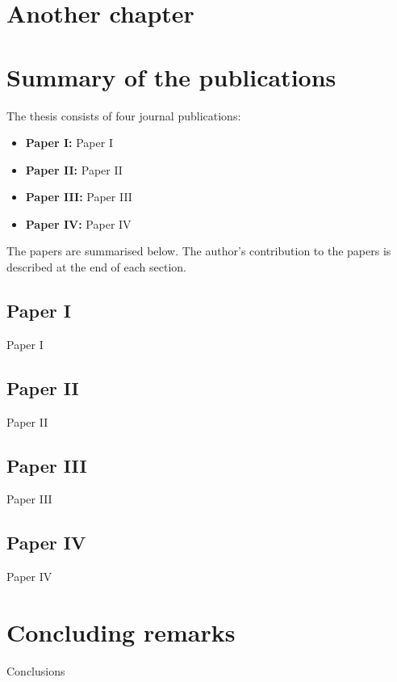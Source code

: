 \documentclass[11pt,english]{report}
\begin{document}
\chapter{Another chapter}



\chapter{Summary of the publications}

The thesis consists of four journal publications:
\begin{itemize}
  \item \textbf{Paper I:} Paper I
  \item \textbf{Paper II:} Paper II
  \item \textbf{Paper III:} Paper III
  \item \textbf{Paper IV:} Paper IV
\end{itemize}
The papers are summarised below. The author's contribution to the papers is
described at the end of each section.

\section{Paper I}
Paper I

\section{Paper II}
Paper II

\section{Paper III}
Paper III

\section{Paper IV}
Paper IV

\chapter{Concluding remarks}
Conclusions



\end{document}
